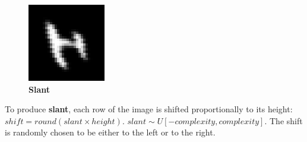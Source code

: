\documentclass{article} %
\begin{document}
\begin{minipage}[h]{\linewidth}
\begin{figure}
\begin{center}
\vspace*{-5mm}
\includegraphics[scale=.4]{images/Slant_only.png}\\
{\bf Slant}
\end{center}
\end{figure}

To produce {\bf slant}, each row of the image is shifted
proportionally to its height: $shift = round(slant \times height)$.  
$slant \sim U[-complexity,complexity]$.
The shift is randomly chosen to be either to the left or to the right.
\end{minipage}
\vspace*{10mm}
\end{document}
